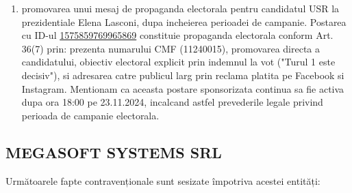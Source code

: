 \documentclass[a4paper,12pt]{article}
\begin{document}
\begin{enumerate}[leftmargin=*, label=\arabic*.)]
    \item promovarea unui mesaj de propaganda electorala pentru candidatul USR la prezidentiale Elena Lasconi, dupa incheierea perioadei de campanie. Postarea cu ID-ul \href{https://www.facebook.com/ads/library/?id=1575859769965869}{1575859769965869} constituie propaganda electorala conform Art. 36(7) prin: prezenta numarului CMF (11240015), promovarea directa a candidatului, obiectiv electoral explicit prin indemnul la vot ("Turul 1 este decisiv"), si adresarea catre publicul larg prin reclama platita pe Facebook si Instagram. Mentionam ca aceasta postare sponsorizata continua sa fie activa dupa ora 18:00 pe 23.11.2024, incalcand astfel prevederile legale privind perioada de campanie electorala.
\end{enumerate}

\vspace{0.5cm}

\subsection{MEGASOFT SYSTEMS SRL}
Următoarele fapte contravenționale sunt sesizate împotriva acestei entități:
\end{document}
